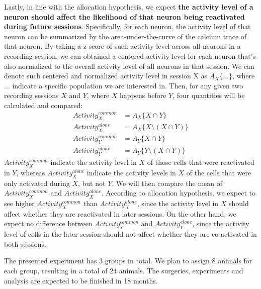 \documentclass[master.tex]{subfiles}
\begin{document}
Lastly, in line with the allocation hypothesis, we expect \textbf{the activity
  level of a neuron should affect the likelihood of that neuron being
  reactivated during future sessions}. Specifically, for each neuron, the
activity level of that neuron can be summarized by the area-under-the-curve of
the calcium trace of that neuron. By taking a z-score of such activity level
across all neurons in a recording session, we can obtained a centered activity
level for each neuron that's also normalized to the overall activity level of
all neurons in that session. We can denote such centered and normalized activity
level in session X as $A_X\{\ldots\}$, where $\ldots$ indicate a specific
population we are interested in. Then, for any given two recording sessions $X$
and $Y$, where $X$ happens before $Y$, four quantities will be calculated and
compared:
\begin{align*}
  Activity_{X}^{common} & = A_X\{X \cap Y\} \\
  Activity_{X}^{alone} & = A_X\{X \setminus (X \cap Y)\} \\
  Activity_{Y}^{common} & = A_Y\{X \cap Y\} \\
  Activity_{Y}^{alone} & = A_Y\{Y \setminus (X \cap Y)\}
\end{align*}
$Activity_{X}^{common}$ indicate the activity level in $X$ of those cells that
were reactivated in $Y$, whereas $Activity_{X}^{alone}$ indicate the activity
levels in $X$ of the cells that were only activated during $X$, but not $Y$. We
will then compare the mean of $Activity_{X}^{common}$ and
$Activity_{X}^{alone}$. According to allocation hypothesis, we expect to see
higher $Activity_{X}^{common}$ than $Activity_{X}^{alone}$, since the activity
level in $X$ should affect whether they are reactivated in later sessions. On
the other hand, we expect no difference between $Activity_{Y}^{common}$ and
$Activity_{Y}^{alone}$, since the activity level of cells in the later session
should not affect whether they are co-activated in both sessions.

The presented experiment has 3 groups in total. We plan to assign 8 animals for
each group, resulting in a total of 24 animals. The surgeries, experiments and
analysis are expected to be finished in 18 months.
\end{document}
